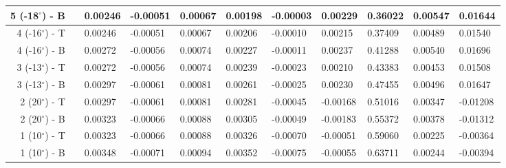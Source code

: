 \begin{table}[H]
\begin{longtable}{@{}rllllllllll@{}}
  5 (-18$^\circ$) - B &&       0.00246 &      -0.00051 &       0.00067 &       0.00198 &      -0.00003 &       0.00229 &     0.36022 &     0.00547 &     0.01644 \\\midrule
  4 (-16$^\circ$) - T &&       0.00246 &      -0.00051 &       0.00067 &       0.00206 &      -0.00010 &       0.00215 &     0.37409 &     0.00489 &     0.01540 \\
  4 (-16$^\circ$) - B &&       0.00272 &      -0.00056 &       0.00074 &       0.00227 &      -0.00011 &       0.00237 &     0.41288 &     0.00540 &     0.01696 \\\midrule
  3 (-13$^\circ$) - T &&       0.00272 &      -0.00056 &       0.00074 &       0.00239 &      -0.00023 &       0.00210 &     0.43383 &     0.00453 &     0.01508 \\
  3 (-13$^\circ$) - B &&       0.00297 &      -0.00061 &       0.00081 &       0.00261 &      -0.00025 &       0.00230 &     0.47455 &     0.00496 &     0.01647 \\\midrule
   2 (20$^\circ$) - T &&       0.00297 &      -0.00061 &       0.00081 &       0.00281 &      -0.00045 &      -0.00168 &     0.51016 &     0.00347 &    -0.01208 \\
   2 (20$^\circ$) - B &&       0.00323 &      -0.00066 &       0.00088 &       0.00305 &      -0.00049 &      -0.00183 &     0.55372 &     0.00378 &    -0.01312 \\\midrule
   1 (10$^\circ$) - T &&       0.00323 &      -0.00066 &       0.00088 &       0.00326 &      -0.00070 &      -0.00051 &     0.59060 &     0.00225 &    -0.00364 \\
   1 (10$^\circ$) - B &&       0.00348 &      -0.00071 &       0.00094 &       0.00352 &      -0.00075 &      -0.00055 &     0.63711 &     0.00244 &    -0.00394 \\\midrule
\end{longtable}
\end{table}